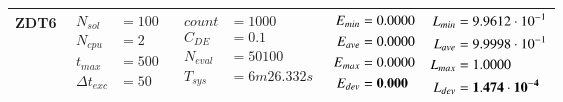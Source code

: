 \begin{table*} [!t]
\begin{tabular}[c]{ccccc}
\hline



ZDT6
&
{$\!\begin{aligned}
    N_{sol}        &= 100 \\
	N_{cpu}        &= 2 \\
	t_{max}        &= 500 \\
	\Delta t_{exc} &= 50
\end{aligned}$}
&
{$\!\begin{aligned}
	count    &= 1000 \\
	C_{DE}   &= 0.1 \\
	N_{eval} &= 50100 \\
	T_{sys}  &= 6m26.332s
\end{aligned}$}
&
{$\!\begin{aligned}
    E_{min} &= 0.0000 \\
    E_{ave} &= 0.0000 \\
    E_{max} &= 0.0000 \\
    E_{dev} &= {\bf 0.000}
\end{aligned}$}
&
{$\!\begin{aligned}
    L_{min} &= 9.9612\cdot 10^{-1} \\
    L_{ave} &= 9.9998\cdot 10^{-1} \\
    L_{max} &= 1.0000 \\
    L_{dev} &= {\bf 1.474\cdot 10^{-4}}
\end{aligned}$} \\

\bottomrule


\end{tabular}
\label{tab:two-obj:A}
\end{table*}






